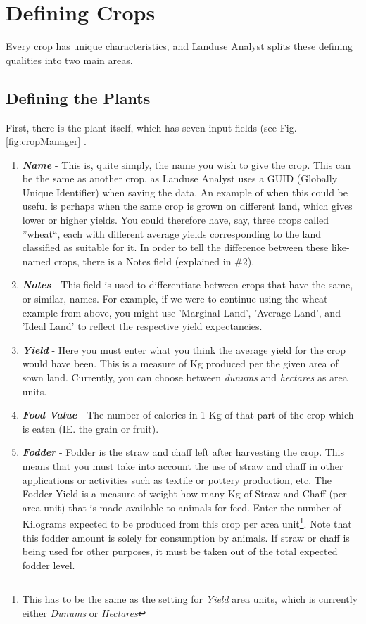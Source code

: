 \section{Defining Crops}Every crop has unique
characteristics, and Landuse Analyst splits these defining qualities into two
main areas.
  \subsection{Defining the Plants}First, there is
the plant itself, which has seven input fields (see Fig. \ref{fig:cropManager} .
    \begin{enumerate}
      \item \textbf{\textit{Name}} - This is, quite simply, the name you wish to
give the crop.  This can be the same as another crop, as Landuse Analyst uses a
GUID (Globally Unique Identifier) when saving the data.  An example of when this
could be useful is perhaps when the same crop is grown on different land, which
gives lower or higher yields.  You could therefore have, say, three crops called
''wheat``, each with different average yields corresponding to the land
classified as suitable for it.  In order to tell the difference between these
like-named crops, there is a Notes field (explained in \#2).

      \item \textbf{\textit{Notes}} - This field is used to differentiate
between crops that have the same, or similar, names.  For example, if we were to
continue using the wheat example from above, you might use 'Marginal Land',
'Average Land', and 'Ideal Land' to reflect the respective yield expectancies.

      \item \textbf{\textit{Yield}} - Here you must enter what you think the
average yield for the crop would have been. This is a measure of Kg produced per
the given area of sown land.  Currently, you can choose between \textit{dunums}
and \textit{hectares} as area units.

      \item \textbf{\textit{Food Value}} - The number of calories in 1 Kg of
that part of the crop which is eaten (IE. the grain or fruit).

      \item \textbf{\textit{Fodder}} - Fodder is the straw and chaff left after
harvesting the crop.  This means that you must take into account the use of
straw and chaff in other applications or activities such as textile or pottery
production, etc.  The Fodder Yield is a measure of weight how many Kg of Straw
and Chaff (per area unit) that is made available to animals for feed.  Enter the
number of Kilograms expected to be produced from this crop per area
unit\footnote{This has to be the same as the setting for \textit{Yield} area
units, which is currently either \textit{Dunums} or \textit{Hectares}}.  Note
that this fodder amount is solely for consumption by animals.  If straw or chaff
is being used for other purposes, it must be taken out of the total expected
fodder level.


\end{enumerate}
